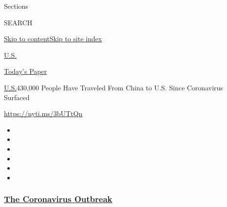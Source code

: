 Sections

SEARCH

\protect\hyperlink{site-content}{Skip to
content}\protect\hyperlink{site-index}{Skip to site index}

\href{https://www.nytimes3xbfgragh.onion/section/us}{U.S.}

\href{https://myaccount.nytimes3xbfgragh.onion/auth/login?response_type=cookie\&client_id=vi}{}

\href{https://www.nytimes3xbfgragh.onion/section/todayspaper}{Today's
Paper}

\href{/section/us}{U.S.}\textbar{}430,000 People Have Traveled From
China to U.S. Since Coronavirus Surfaced

\url{https://nyti.ms/3bUTtQn}

\begin{itemize}
\item
\item
\item
\item
\item
\item
\end{itemize}

\hypertarget{the-coronavirus-outbreak}{%
\subsubsection{\texorpdfstring{\href{https://www.nytimes3xbfgragh.onion/news-event/coronavirus?name=styln-coronavirus-national\&region=TOP_BANNER\&block=storyline_menu_recirc\&action=click\&pgtype=Article\&impression_id=84f4bb20-f4c4-11ea-8094-d5ba3891c9e8\&variant=undefined}{The
Coronavirus
Outbreak}}{The Coronavirus Outbreak}}\label{the-coronavirus-outbreak}}


